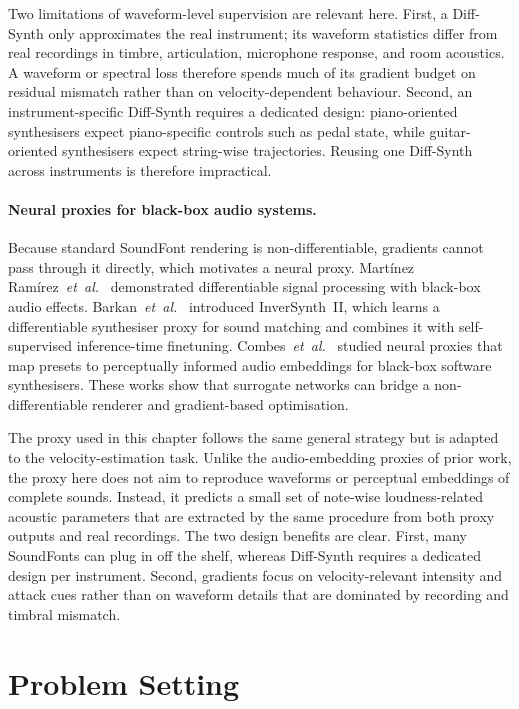 Two limitations of waveform-level supervision are relevant here. First, a Diff-Synth only approximates the real instrument; its waveform statistics differ from real recordings in timbre, articulation, microphone response, and room acoustics. A waveform or spectral loss therefore spends much of its gradient budget on residual mismatch rather than on velocity-dependent behaviour. Second, an instrument-specific Diff-Synth requires a dedicated design: piano-oriented synthesisers expect piano-specific controls such as pedal state, while guitar-oriented synthesisers expect string-wise trajectories. Reusing one Diff-Synth across instruments is therefore impractical.

\paragraph{Neural proxies for black-box audio systems.}
Because standard SoundFont rendering is non-differentiable, gradients cannot pass through it directly, which motivates a neural proxy. Mart\'inez Ram\'irez~\emph{et~al.}~\cite{martinez2021differentiable} demonstrated differentiable signal processing with black-box audio effects. Barkan~\emph{et~al.}~\cite{barkan2023is2} introduced InverSynth~II, which learns a differentiable synthesiser proxy for sound matching and combines it with self-supervised inference-time finetuning. Combes~\emph{et~al.}~\cite{combes2025neural} studied neural proxies that map presets to perceptually informed audio embeddings for black-box software synthesisers. These works show that surrogate networks can bridge a non-differentiable renderer and gradient-based optimisation.

The proxy used in this chapter follows the same general strategy but is adapted to the velocity-estimation task. Unlike the audio-embedding proxies of prior work, the proxy here does not aim to reproduce waveforms or perceptual embeddings of complete sounds. Instead, it predicts a small set of note-wise loudness-related acoustic parameters that are extracted by the same procedure from both proxy outputs and real recordings. The two design benefits are clear. First, many SoundFonts can plug in off the shelf, whereas Diff-Synth requires a dedicated design per instrument. Second, gradients focus on velocity-relevant intensity and attack cues rather than on waveform details that are dominated by recording and timbral mismatch.

\section{Problem Setting}
\label{sec:bp:problem}

